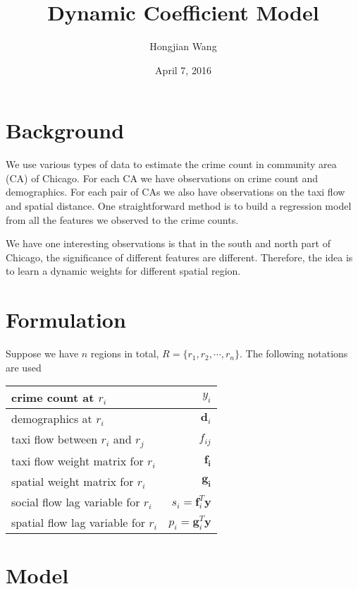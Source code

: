 \documentclass{article}
\title{Dynamic Coefficient Model}
\author{Hongjian Wang}
\date{April 7, 2016}
\begin{document}
\maketitle


\section{Background}


We use various types of data to estimate the crime count in community area (CA) of Chicago. For each CA we have observations on crime count and demographics. For each pair of CAs we also have observations on the taxi flow and spatial distance. One straightforward method is to build a regression model from all the features we observed to the crime counts.

We have one interesting observations is that in the south and north part of Chicago, the significance of different features are different. Therefore, the idea is to learn a dynamic weights for different spatial region.



\section{Formulation}


Suppose we have $n$ regions in total, $R = \{ r_1, r_2, \cdots, r_n \}$.
The following notations are used

\begin{table}[h]
\centering
\begin{tabular}{|l|r|}
\hline
crime count at $r_i$ & $y_i$ \\ \hline
demographics at $r_i$ & $\mathbf{d}_i$ \\ \hline
taxi flow between $r_i$ and $r_j$ & $f_{ij}$ \\ \hline
taxi flow weight matrix for $r_i$ & $\mathbf{f_i}$ \\ \hline
spatial weight matrix for $r_i$ & $\mathbf{g_i}$ \\ \hline
social flow lag variable for $r_i$ & $s_i = \mathbf{f}_i^T \mathbf{y}$ \\\hline
spatial flow lag variable for $r_i$ & $p_i = \mathbf{g}_i^T \mathbf{y}$ \\\hline
\end{tabular}
\end{table}


\section{Model}
\end{document}
